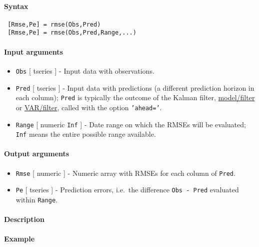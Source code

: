 


	\paragraph{Syntax}
 
 \begin{verbatim}
 [Rmse,Pe] = rmse(Obs,Pred)
 [Rmse,Pe] = rmse(Obs,Pred,Range,...)
 \end{verbatim}
 
 \paragraph{Input arguments}
 
 \begin{itemize}
 \item
   \texttt{Obs} {[} tseries {]} - Input data with observations.
 \item
   \texttt{Pred} {[} tseries {]} - Input data with predictions (a
   different prediction horizon in each column); \texttt{Pred} is
   typically the outcome of the Kalman filter, \url{model/filter} or
   \url{VAR/filter}, called with the option \texttt{'ahead='}.
 \item
   \texttt{Range} {[} numeric \textbar{} \texttt{Inf} {]} - Date range on
   which the RMSEs will be evaluated; \texttt{Inf} means the entire
   possible range available.
 \end{itemize}
 
 \paragraph{Output arguments}
 
 \begin{itemize}
 \item
   \texttt{Rmse} {[} numeric {]} - Numeric array with RMSEs for each
   column of \texttt{Pred}.
 \item
   \texttt{Pe} {[} tseries {]} - Prediction errors, i.e.~the difference
   \texttt{Obs - Pred} evaluated within \texttt{Range}.
 \end{itemize}
 
 \paragraph{Description}
 
 \paragraph{Example}


